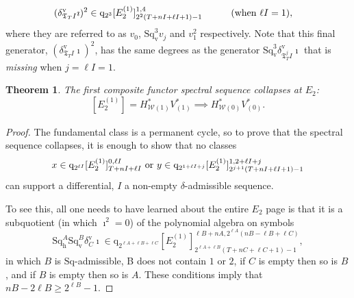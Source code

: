 \documentclass[11pt]{amsart} \renewcommand{\baselinestretch}{1.2}
\theoremstyle{plain}
\newtheorem{thm}{Theorem}[section]
\theoremstyle{definition}
\newcommand{\calw}{\mathcal{W}}
\newcommand{\quadgrad}[1]{\mathrm{q}_{#1}}
\newcommand{\Sq}{\mathrm{Sq}}
\newcommand{\TOP}{\mathfrak{T}}
\newcommand{\E}[5]{[E^{#1}_{#2}#3]^{#4}_{#5}}
\newcommand{\uver}{^\mathrm{v}}
\newcommand{\dver}{_\mathrm{v}}
\newcommand{\dhor}{_\mathrm{h}}
\newcommand{\Sqh}{\mathrm{Sq}\dhor}
\newcommand{\Sqv}{\mathrm{Sq}\dver}
\newcommand{\deltav}{\delta\uver}
\begin{document}
\begin{Calculations of HWn}
\begin{alignat}{2}
(\deltav_{\TOP_T I}\imath)^{2}&\in 
\quadgrad{2^{3}}\E{(1)}{2}{}{1,4}{2^{2}(T+nI+\ell I+1)-1}
&\qquad&\textup{(when $\ell I=1$)},
\label{last generator}
\end{alignat}
where they are referred to  as $v_0$, $\Sqv^3v_j$ and $v_1^2$ respectively.
Note that this final generator, $(\deltav_{\TOP_T I}\imath)^{2}$, has the same degrees as the generator $\Sqv^{3}\deltav_{\TOP_T^j\!I}\imath$ that is \emph{missing} when $j=\ell I=1$.
\begin{thm}
The first composite functor spectral sequence collapses at $E_2$:
\[\E{(1)}{2}{}{}{}=H^*_{\calw(1)}V^*_{(1)}\implies H^*_{\calw(0)}V^*_{(0)}.\]
\end{thm}
\begin{proof}
The fundamental class is a permanent cycle, so to prove that the spectral sequence collapses, it is enough to show that no classes
\[x\in \quadgrad{2^{\ell I}}\E{(1)}{2}{}{0,\ell I}{T+nI+\ell I}\textup{ or }y\in \quadgrad{2^{1+\ell I+j}}\E{(1)}{2}{}{1,2+\ell I+j}{2^{j+1}(T+nI+\ell I+1)-1}\]
can support a differential, $I$ a non-empty $\delta$-admissible sequence.

To see this, all one needs to have learned about the entire $E_2$ page is that it is a subquotient (in which $\imath^2=0$) of the polynomial algebra on symbols
\[\Sqh^A\Sqv^B\deltav_C\imath\in \quadgrad{2^{\ell A+\ell B+\ell C}}\E{(1)}{2}{}{\ell B+nA,2^{\ell A}(nB-\ell B+\ell C)}{2^{\ell A+\ell B}(T+nC+\ell C+1)-1},\]
in which $B$ is $\Sq$-admissible, B does not contain $1$ or $2$, if $C$ is empty then so is $B$, and if $B$ is empty then so is $A$. These conditions imply that $nB-2\ell B\geq2^{\ell B}-1$.  %


\end{proof}
\end{Calculations of HWn}
\end{document}
